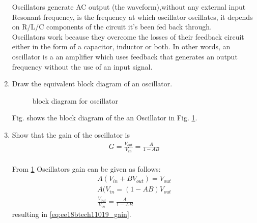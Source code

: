 \begin{enumerate}[label=\thesection.\arabic*.,ref=\thesection.\theenumi]

Oscillators generate AC output (the waveform),without any external input \\
Resonant frequency, is the frequency at which oscillator oscillates, it depends on R/L/C components of the circuit it's been fed back through.\\
Oscillators work because they overcome the losses of their feedback circuit either in the form of a capacitor, inductor or both. In other words, an oscillator is a an amplifier which uses feedback that generates an output frequency without the use of an input signal.\\ %
\newline

\item Draw the equivalent block diagram of an oscillator.\\
\solution
\begin{figure}[!ht]
    \begin{center}
		
		\resizebox{\columnwidth}{!}{} %
	\end{center}
\caption{block diagram for oscillator}
\label{fig:ee18btech11019_hart_block}
\end{figure}
Fig. \label{fig:ee18btech11019_hart_block} shows the block diagram of the an Oscillator in Fig. \ref{fig:ee18btech11019_hart_block}.\\




\item Show that the gain of the oscillator is \\
\begin{align}
    G = \frac{V_{out}}{V_{in}} = \frac{A}{1 - AB}
\label{eq:ee18btech11019_gain}
\end{align}
%
\\
\solution From \ref{fig:ee18btech11019_hart_block}
Oscillators gain can be given as follows:\\
\begin{align}
    A(V_{in} + BV_{out}) =V_{out}\\
    A(V_{in} = (1-AB)V_{out}\\
    \frac{V_{out}}{V_{in}} = \frac{A}{1 - AB}
\end{align}
%
resulting in \eqref{eq:ee18btech11019_gain}.




\end{enumerate}
